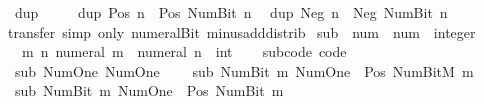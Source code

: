 \begin{isabellebody}
\ \ {\isachardoublequoteopen}dup\ {}\ {\isacharequal}{\kern0pt}\ {}{\isachardoublequoteclose}\isanewline
\ \ {\isachardoublequoteopen}dup\ {\isacharparenleft}{\kern0pt}Pos\ n{\isacharparenright}{\kern0pt}\ {\isacharequal}{\kern0pt}\ Pos\ {\isacharparenleft}{\kern0pt}Num{\isachardot}{\kern0pt}Bit{}\ n{\isacharparenright}{\kern0pt}{\isachardoublequoteclose}\isanewline
\ \ {\isachardoublequoteopen}dup\ {\isacharparenleft}{\kern0pt}Neg\ n{\isacharparenright}{\kern0pt}\ {\isacharequal}{\kern0pt}\ Neg\ {\isacharparenleft}{\kern0pt}Num{\isachardot}{\kern0pt}Bit{}\ n{\isacharparenright}{\kern0pt}{\isachardoublequoteclose}\isanewline
%
\isadelimproof
\ \ %
\endisadelimproof
%
\isatagproof
{}\isamarkupfalse%
\ {\isacharparenleft}{\kern0pt}transfer{\isacharcomma}{\kern0pt}\ simp\ only{\isacharcolon}{\kern0pt}\ numeral{\isacharunderscore}{\kern0pt}Bit{}\ minus{\isacharunderscore}{\kern0pt}add{\isacharunderscore}{\kern0pt}distrib{\isacharparenright}{\kern0pt}{\isacharplus}{\kern0pt}%
\endisatagproof
{\isafoldproof}%
%
\isadelimproof
\isanewline
%
\endisadelimproof
\isanewline
{}\isamarkupfalse%
\ sub\ {\isacharcolon}{\kern0pt}{\isacharcolon}{\kern0pt}\ {\isachardoublequoteopen}num\ {\isasymRightarrow}\ num\ {\isasymRightarrow}\ integer{\isachardoublequoteclose}\isanewline
\ \ \ {\isachardoublequoteopen}{\isasymlambda}m\ n{\isachardot}{\kern0pt}\ numeral\ m\ {\isacharminus}{\kern0pt}\ numeral\ n\ {\isacharcolon}{\kern0pt}{\isacharcolon}{\kern0pt}\ int{\isachardoublequoteclose}\isanewline
%
\isadelimproof
\ \ %
\endisadelimproof
%
\isatagproof
\isacommand{{\isachardot}{\kern0pt}}\isamarkupfalse%
%
\endisatagproof
{\isafoldproof}%
%
\isadelimproof
\isanewline
%
\endisadelimproof
\isanewline
{}\isamarkupfalse%
\ sub{\isacharunderscore}{\kern0pt}code\ {\isacharbrackleft}{\kern0pt}code{\isacharbrackright}{\kern0pt}{\isacharcolon}{\kern0pt}\isanewline
\ \ {\isachardoublequoteopen}sub\ Num{\isachardot}{\kern0pt}One\ Num{\isachardot}{\kern0pt}One\ {\isacharequal}{\kern0pt}\ {}{\isachardoublequoteclose}\isanewline
\ \ {\isachardoublequoteopen}sub\ {\isacharparenleft}{\kern0pt}Num{\isachardot}{\kern0pt}Bit{}\ m{\isacharparenright}{\kern0pt}\ Num{\isachardot}{\kern0pt}One\ {\isacharequal}{\kern0pt}\ Pos\ {\isacharparenleft}{\kern0pt}Num{\isachardot}{\kern0pt}BitM\ m{\isacharparenright}{\kern0pt}{\isachardoublequoteclose}\isanewline
\ \ {\isachardoublequoteopen}sub\ {\isacharparenleft}{\kern0pt}Num{\isachardot}{\kern0pt}Bit{}\ m{\isacharparenright}{\kern0pt}\ Num{\isachardot}{\kern0pt}One\ {\isacharequal}{\kern0pt}\ Pos\ {\isacharparenleft}{\kern0pt}Num{\isachardot}{\kern0pt}Bit{}\ m{\isacharparenright}{\kern0pt}{\isachardoublequoteclose}\isanewline

\end{isabellebody}
